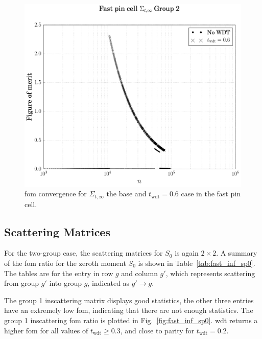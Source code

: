 \begin{figure}[hbtp]
  \centering
  \includegraphics[scale=0.5]{images/results/fast_inf_tot_example}
  \caption[\Acrshort{fom} convergence for $\Sigma_{t,\infty}$ the base
  and $t_{\mathrm{wdt}} = 0.6$ case in the fast pin cell.]{\Acrshort{fom} convergence for
    $\Sigma_{t,\infty}$ the base and $t_{\mathrm{wdt}} = 0.6$ case in the fast pin cell.}
  \label{fig:fast_inf_tot_example}
\end{figure}

\subsection{Scattering Matrices}
\label{sec:fast_inf_sp0}

For the two-group case, the scattering matrices for $S_0$ is again $2 \times 2$. A summary of the \gls{fom} ratio
for the zeroth moment $S_0$ is shown in Table~\ref{tab:fast_inf_sp0}. The
tables are for the entry in row $g$ and column $g'$, which represents
scattering from group $g'$ into group $g$, indicated as $g' \to g$.

The group 1 inscattering matrix displays good statistics, the other
three entries have an extremely low \gls{fom}, indicating that there
are not enough statistics. The group 1 inscattering \gls{fom} ratio is
plotted in Fig.~\ref{fig:fast_inf_sp0}. \gls{wdt} returns a higher
\gls{fom} for all values of $t_{\mathrm{wdt}} \geq 0.3$, and close to
parity for $t_{\mathrm{wdt}} = 0.2$.

